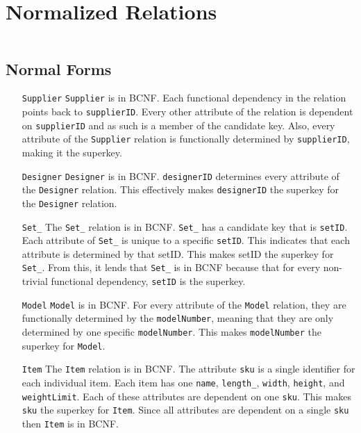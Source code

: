 \documentclass[american,extrafontsizes,12pt,portrait,letterpaper,oneside,onecolumn,final]{memoir}
\newcommand*{\sqli}[1]{\texttt{#1}}
\begin{document}
\section{Normalized Relations}

\inputminted[linenos,breaklines,breakbytokenanywhere]{sql}{../Part\ 4/normalized.sql}

\subsection{Normal Forms}

\begin{enumerate}[leftmargin=*,widest={\texttt{DistributionCenter}}]

\item[\sqli{Supplier}]
\sqli{Supplier} is in BCNF.
Each functional dependency in the relation points back to \sqli{supplierID}.
Every other attribute of the relation is dependent on \sqli{supplierID} and as such is a member of the candidate key.
Also, every attribute of the \sqli{Supplier} relation is functionally determined by \sqli{supplierID}, making it the superkey.

\item[\sqli{Designer}]
\sqli{Designer} is in BCNF.
\sqli{designerID} determines every attribute of the \sqli{Designer} relation.
This effectively makes \sqli{designerID} the superkey for the \sqli{Designer} relation.

\item[\sqli{Set_}]
The \sqli{Set_} relation is in BCNF.
\sqli{Set_} has a candidate key that is \sqli{setID}.
Each attribute of \sqli{Set_} is unique to a specific \sqli{setID}.
This indicates that each attribute is determined by that setID.
This makes setID the superkey for \sqli{Set_}.
From this, it lends that \sqli{Set_} is in BCNF because that for every non\hyp trivial functional dependency, \sqli{setID} is the superkey.

\item[\sqli{Model}]
\sqli{Model} is in BCNF.
For every attribute of the \sqli{Model} relation, they are functionally determined by the \sqli{modelNumber}, meaning that they are only determined by one specific \sqli{modelNumber}.
This makes \sqli{modelNumber} the superkey for \sqli{Model}.

\item[\sqli{Item}]
The \sqli{Item} relation is in BCNF.
The attribute \sqli{sku} is a single identifier for each individual item.
Each item has one \sqli{name}, \sqli{length_}, \sqli{width}, \sqli{height}, and \sqli{weightLimit}. Each of these attributes are dependent on one \sqli{sku}.
This makes \sqli{sku} the superkey for \sqli{Item}.
Since all attributes are dependent on a single \sqli{sku} then \sqli{Item} is in BCNF.


\end{enumerate}
\end{document}
